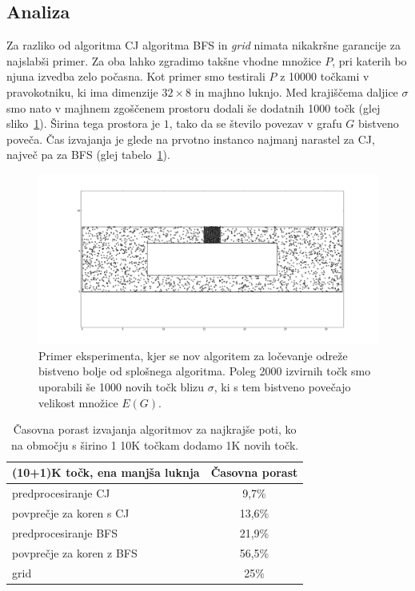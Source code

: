 \documentclass[a4paper, 12pt]{book}
\begin{document}
\subsection{Analiza}
\label{analiza}

Za razliko od algoritma CJ algoritma BFS in \textit{grid} nimata nikakršne garancije za najslabši primer. Za oba lahko zgradimo takšne vhodne množice $P$, pri katerih bo njuna izvedba zelo počasna. Kot primer smo testirali $P$ z 10000 točkami v pravokotniku, ki ima dimenzije $32\times 8$ in majhno luknjo. Med krajiščema daljice $\sigma$ smo nato v majhnem zgoščenem prostoru dodali še dodatnih 1000 točk (glej sliko~\ref{sep-stuffed}). Širina tega prostora je $1$, tako da se število povezav v grafu $G$ bistveno poveča. Čas izvajanja je glede na prvotno instanco najmanj narastel za CJ, največ pa za BFS (glej tabelo~\ref{table-increase}).

\begin{figure}[htp]
\centerline{\includegraphics[scale=0.3]{pics/32-1-5000-stuffed.png}}
\caption{Primer eksperimenta, kjer se nov algoritem za ločevanje odreže bistveno bolje od splošnega algoritma. Poleg 2000 izvirnih točk smo uporabili še 1000 novih točk blizu $\sigma$, ki s tem bistveno povečajo velikost množice $E(G)$.}
\label{sep-stuffed}
\end{figure}

\begin{table}[htp]
\begin{center}
\begin{tabular}{l*{1}{c}}
(10+1)K točk, ena manjša luknja & \multicolumn{1}{c}{Časovna porast} \\
\hline
predprocesiranje CJ &	9,7\%		\\
povprečje za koren s CJ &	13,6\%	\\
predprocesiranje BFS & 21,9\%	\\
povprečje za koren z BFS &	56,5\% \\
grid &	25\%
\end{tabular}
\caption{Časovna porast izvajanja algoritmov za najkrajše poti, ko na območju s širino 1 10K točkam dodamo 1K novih točk.}
\label{table-increase}
\end{center}
\end{table}
\end{document}
